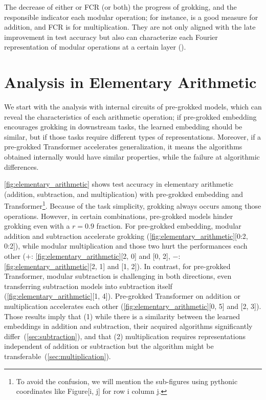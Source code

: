 \documentclass[10pt]{article} %
\newcommand{\update}[1]{{\color{black}{#1}}}
\begin{document}
The decrease of either \update{FFD} or FCR (or both) \update{correlates to} the progress of grokking, and the responsible indicator \update{varies for} each modular operation; for instance, \update{FFD} is a good measure for addition, and FCR is for multiplication.
They are not only aligned with the late improvement in test accuracy but also can characterize each Fourier representation of modular operations at a certain layer ().





\section{Analysis in Elementary Arithmetic}
\label{sec:elem}
We start with the analysis with internal circuits of pre-grokked models, which can reveal the characteristics of each arithmetic operation;
if pre-grokked embedding encourages grokking in downstream tasks, the learned embedding should be similar, but if \update{pre-grokked embedding prevents grokking,} those tasks \update{may} require different types of representations.
Moreover, if a pre-grokked Transformer accelerates generalization, it means the algorithms obtained internally would have similar properties, while the failure \update{may hint} at algorithmic differences.

\autoref{fig:elementary_arithmetic} shows test accuracy in elementary arithmetic (addition, subtraction, and multiplication) with pre-grokked embedding and Transformer\footnote{To avoid the confusion, we will mention the sub-figures using pythonic coordinates like Figure[i, j] for row i column j.}.
Because of the task simplicity, grokking always occurs among those operations. However, in certain combinations, pre-grokked models hinder grokking even with a $r=0.9$ fraction.
For pre-grokked embedding, modular addition and subtraction accelerate grokking (\autoref{fig:elementary_arithmetic}[0:2, 0:2]), while modular multiplication and those two hurt the performances each other ($+$: \autoref{fig:elementary_arithmetic}[2, 0] and [0, 2], $-$: \autoref{fig:elementary_arithmetic}[2, 1] and [1, 2]).
In contrast, for pre-grokked Transformer, modular subtraction is challenging in both directions, even transferring subtraction models into subtraction itself (\autoref{fig:elementary_arithmetic}[1, 4]).
Pre-grokked Transformer on addition or multiplication accelerates each other (\autoref{fig:elementary_arithmetic}[0, 5] and [2, 3]).
Those results \update{might} imply that (1) while there is a similarity between the learned embeddings in addition and subtraction, their acquired algorithms significantly differ~(\cref{sec:subtraction}), and that (2) multiplication requires representations independent of addition or subtraction but the algorithm might be transferable~(\cref{sec:multiplication}).
\end{document}
